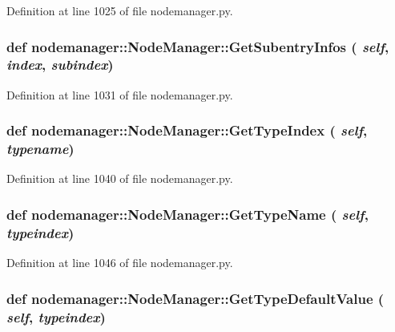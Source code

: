 Definition at line 1025 of file nodemanager.py.\hypertarget{classnodemanager_1_1NodeManager_b305e31c72f62266cfc5e15b056a0e90}{
\subsubsection[GetSubentryInfos]{\setlength{\rightskip}{0pt plus 5cm}def nodemanager::Node\-Manager::Get\-Subentry\-Infos ( {\em self},  {\em index},  {\em subindex})}}
\label{classnodemanager_1_1NodeManager_b305e31c72f62266cfc5e15b056a0e90}




Definition at line 1031 of file nodemanager.py.\hypertarget{classnodemanager_1_1NodeManager_a6660f49630ad17289a6f8c13569aef8}{
\subsubsection[GetTypeIndex]{\setlength{\rightskip}{0pt plus 5cm}def nodemanager::Node\-Manager::Get\-Type\-Index ( {\em self},  {\em typename})}}
\label{classnodemanager_1_1NodeManager_a6660f49630ad17289a6f8c13569aef8}




Definition at line 1040 of file nodemanager.py.\hypertarget{classnodemanager_1_1NodeManager_02618960ca94cf1e287758a4cd8e1891}{
\subsubsection[GetTypeName]{\setlength{\rightskip}{0pt plus 5cm}def nodemanager::Node\-Manager::Get\-Type\-Name ( {\em self},  {\em typeindex})}}
\label{classnodemanager_1_1NodeManager_02618960ca94cf1e287758a4cd8e1891}




Definition at line 1046 of file nodemanager.py.\hypertarget{classnodemanager_1_1NodeManager_b8edb6dc0298dc7d117a327c06a24ab9}{
\subsubsection[GetTypeDefaultValue]{\setlength{\rightskip}{0pt plus 5cm}def nodemanager::Node\-Manager::Get\-Type\-Default\-Value ( {\em self},  {\em typeindex})}}
\label{classnodemanager_1_1NodeManager_b8edb6dc0298dc7d117a327c06a24ab9}




